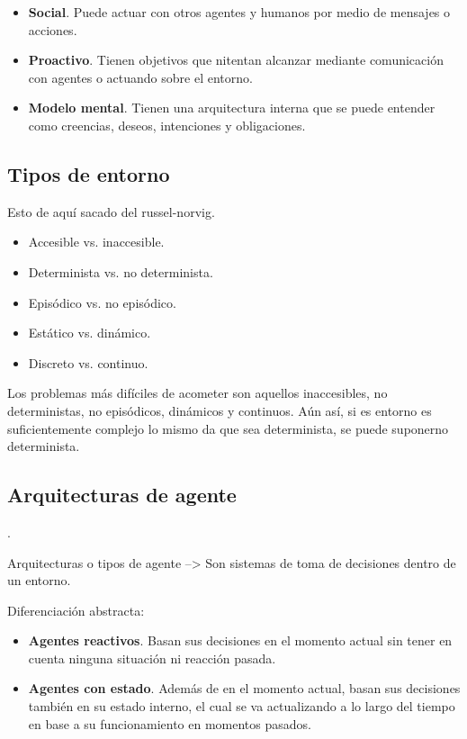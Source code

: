 \begin{itemize}
	\item \textbf{Social}. Puede actuar con otros agentes y humanos por medio de mensajes o acciones.
	\item \textbf{Proactivo}. Tienen objetivos que nitentan alcanzar mediante comunicación con agentes o actuando sobre el entorno.
	\item \textbf{Modelo mental}. Tienen una arquitectura interna que se puede entender como creencias, deseos, intenciones y obligaciones.
\end{itemize}

\subsection{Tipos de entorno}

Esto de aquí sacado del russel-norvig.

\begin{itemize}
	\item Accesible vs. inaccesible.
	\item Determinista vs. no determinista.
	\item Episódico vs. no episódico.
	\item Estático vs. dinámico.
	\item Discreto vs. continuo.
\end{itemize}

Los problemas más difíciles de acometer son aquellos inaccesibles, no deterministas, no episódicos, dinámicos y continuos. Aún así, si es entorno es suficientemente complejo lo mismo da que sea determinista, se puede suponerno determinista.

\subsection{Arquitecturas de agente}

.

Arquitecturas o tipos de agente --> Son sistemas de toma de decisiones dentro de un entorno.

Diferenciación abstracta:

\begin{itemize}
	\item \textbf{Agentes reactivos}. Basan sus decisiones en el momento actual sin tener en cuenta ninguna situación ni reacción pasada.
	\item \textbf{Agentes con estado}. Además de en el momento actual, basan sus decisiones también en su estado interno, el cual se va actualizando a lo largo del tiempo en base a su funcionamiento en momentos pasados.
\end{itemize}

